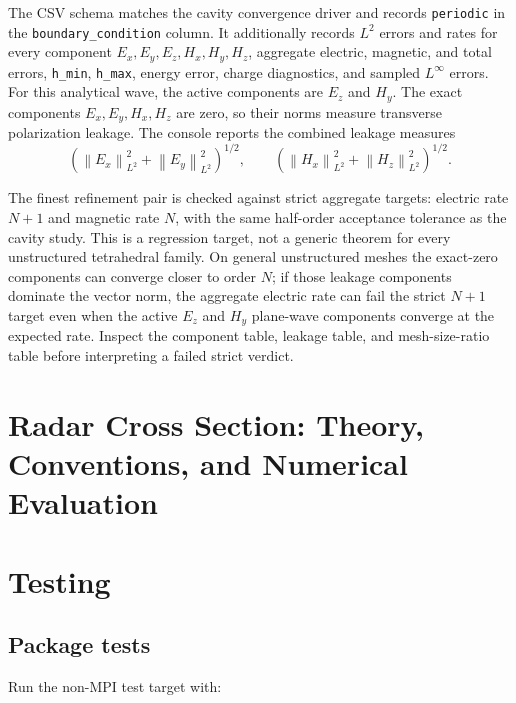 \documentclass[11pt,oneside]{book}
\newcommand{\code}[1]{\texttt{#1}}
\begin{document}
The CSV schema matches the cavity convergence driver and records
\code{periodic} in the \code{boundary\_condition} column. It additionally
records \(L^2\) errors and rates for every component
\(E_x,E_y,E_z,H_x,H_y,H_z\), aggregate electric, magnetic, and total errors,
\code{h\_min}, \code{h\_max}, energy error, charge diagnostics, and sampled
\(L^\infty\) errors. For this analytical wave, the active components are
\(E_z\) and \(H_y\). The exact components
\(E_x,E_y,H_x,H_z\) are zero, so their norms measure transverse
polarization leakage. The console reports the combined leakage measures
\[
  \left(\left\lVert E_x\right\rVert_{L^2}^2+
        \left\lVert E_y\right\rVert_{L^2}^2\right)^{1/2},
  \qquad
  \left(\left\lVert H_x\right\rVert_{L^2}^2+
        \left\lVert H_z\right\rVert_{L^2}^2\right)^{1/2}.
\]

The finest refinement pair is checked against strict aggregate targets:
electric rate \(N+1\) and magnetic rate \(N\), with the same half-order
acceptance tolerance as the cavity study. This is a regression target, not a
generic theorem for every unstructured tetrahedral family. On general
unstructured meshes the exact-zero components can converge closer to order
\(N\); if those leakage components dominate the vector norm, the aggregate
electric rate can fail the strict \(N+1\) target even when the active
\(E_z\) and \(H_y\) plane-wave components converge at the expected rate.
Inspect the component table, leakage table, and mesh-size-ratio table before
interpreting a failed strict verdict.

\chapter{Radar Cross Section: Theory, Conventions, and Numerical Evaluation}

  {}
  {}

\chapter{Testing}

\section{Package tests}

Run the non-MPI test target with:
\end{document}
